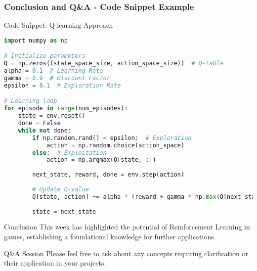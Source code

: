 \documentclass[aspectratio=169]{beamer}
\begin{document}
\begin{frame}[fragile]
    \frametitle{Conclusion and Q\&A - Code Snippet Example}
    \begin{block}{Code Snippet: Q-learning Approach}
    \begin{lstlisting}[language=Python]
import numpy as np

# Initialize parameters
Q = np.zeros((state_space_size, action_space_size))  # Q-table
alpha = 0.1  # Learning Rate
gamma = 0.9  # Discount Factor
epsilon = 0.1  # Exploration Rate

# Learning loop
for episode in range(num_episodes):
    state = env.reset()
    done = False
    while not done:
        if np.random.rand() < epsilon:  # Exploration
            action = np.random.choice(action_space)
        else:  # Exploitation
            action = np.argmax(Q[state, :])
        
        next_state, reward, done = env.step(action)
        
        # Update Q-value
        Q[state, action] += alpha * (reward + gamma * np.max(Q[next_state, :]) - Q[state, action])
        
        state = next_state
    \end{lstlisting}
    \end{block}
    
    \begin{block}{Conclusion}
        This week has highlighted the potential of Reinforcement Learning in games, establishing a foundational knowledge for further applications.
    \end{block}
    
    \begin{block}{Q\&A Session}
        Please feel free to ask about any concepts requiring clarification or their application in your projects.
    \end{block}
\end{frame}
\end{document}
